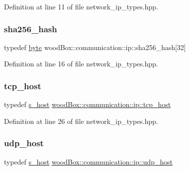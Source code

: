 Definition at line 11 of file network\+\_\+ip\+\_\+types.\+hpp.

\mbox{\label{namespacewood_box_1_1communication_1_1ip_adcec1f9c48ea7ea4e2c4ff86c00fc130}} 
\subsubsection{\texorpdfstring{sha256\+\_\+hash}{sha256\_hash}}
{\footnotesize\ttfamily typedef \mbox{\hyperlink{namespacewood_box_1_1communication_1_1ip_af1b00b9755ebc1bbeb6b5be2068bb421}{byte}} wood\+Box\+::communication\+::ip\+::sha256\+\_\+hash\mbox{[}32\mbox{]}}



Definition at line 16 of file network\+\_\+ip\+\_\+types.\+hpp.

\mbox{\label{namespacewood_box_1_1communication_1_1ip_a09f6bd2ea2cdc975714c7957cd7f1c88}} 
\subsubsection{\texorpdfstring{tcp\+\_\+host}{tcp\_host}}
{\footnotesize\ttfamily typedef \mbox{\hyperlink{structwood_box_1_1communication_1_1ip_1_1s__host}{s\+\_\+host}} \mbox{\hyperlink{namespacewood_box_1_1communication_1_1ip_a09f6bd2ea2cdc975714c7957cd7f1c88}{wood\+Box\+::communication\+::ip\+::tcp\+\_\+host}}}



Definition at line 26 of file network\+\_\+ip\+\_\+types.\+hpp.

\mbox{\label{namespacewood_box_1_1communication_1_1ip_a8527df0a5c8ea4da43a00cbf370b9299}} 
\subsubsection{\texorpdfstring{udp\+\_\+host}{udp\_host}}
{\footnotesize\ttfamily typedef \mbox{\hyperlink{structwood_box_1_1communication_1_1ip_1_1s__host}{s\+\_\+host}} \mbox{\hyperlink{namespacewood_box_1_1communication_1_1ip_a8527df0a5c8ea4da43a00cbf370b9299}{wood\+Box\+::communication\+::ip\+::udp\+\_\+host}}}



